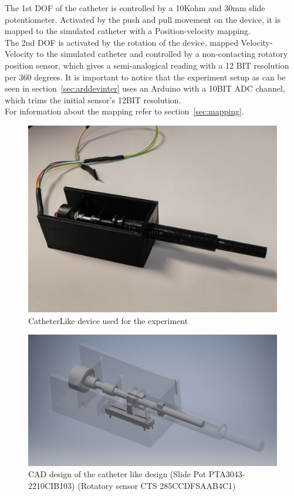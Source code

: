 The 1st DOF of the catheter is controlled by a 10Kohm and 30mm slide potentiometer. Activated by the push and pull movement on the device, it is mapped to the simulated catheter with a Position-velocity mapping.\\

The 2nd DOF is activated by the rotation of the device, mapped Velocity-Velocity to the simulated catheter and controlled by a non-contacting rotatory position sensor, which gives a semi-analogical reading with a 12 BIT resolution per 360 degrees. It is important to notice that the experiment setup as can be seen in section~\ref{sec:arddevinter} uses an Arduino with a 10BIT ADC channel, which trims the initial sensor's 12BIT resolution.\\

For information about the mapping refer to section~\ref{sec:mapping}.\\

\begin{figure}[ht]
   \centering
   \includegraphics[width=0.7\linewidth]{img/catheter.jpg}
   \caption{CatheterLike device used for the experiment}
   \label{img:catheterimg}
\end{figure}

\begin{figure}[ht]
   \centering
   \includegraphics[width=0.7\linewidth]{img/cathetercad.jpg}
   \caption{CAD design of the catheter like design (Slide Pot PTA3043-2210CIB103) (Rotatory sensor CTS 285CCDFSAAB4C1)}
   \label{img:cathetercad}
\end{figure}


